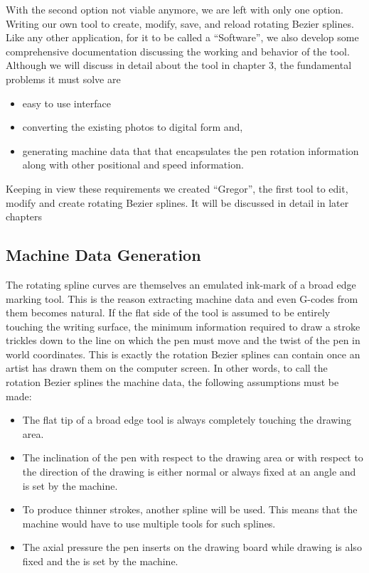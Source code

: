 With the second option not viable anymore, we are left with only one option. Writing our own tool to create, modify, save, and reload rotating Bezier splines. Like any other application, for it to be called a “Software”, we also develop some comprehensive documentation discussing the working and behavior of the tool. Although we will discuss in detail about the tool in chapter 3, the fundamental problems it must solve are

\begin{itemize}
\item easy to use interface
\item converting the existing photos to digital form and,
\item generating machine data that that encapsulates the pen rotation information along with other positional and speed information.
\end{itemize}

Keeping in view these requirements we created “Gregor”, the first tool to edit, modify and create rotating Bezier splines. It will be discussed in detail in later chapters

\subsection{Machine Data Generation}
The rotating spline curves are themselves an emulated ink-mark of a broad edge marking tool. This is the reason extracting machine data and even G-codes from them becomes natural. If the flat side of the tool is assumed to be entirely touching the writing surface, the minimum information required to draw a stroke trickles down to the line on which the pen must move and the twist of the pen in world coordinates. This is exactly the rotation Bezier splines can contain once an artist has drawn them on the computer screen. In other words, to call the rotation Bezier splines the machine data, the following assumptions must be made:
\begin{itemize}
	\item The flat tip of a broad edge tool is always completely touching the drawing area.
	\item The inclination of the pen with respect to the drawing area or with respect to the direction of the drawing is either normal or always fixed at an angle and is set by the machine.
	\item To produce thinner strokes, another spline will be used. This means that the machine would have to use multiple tools for such splines.
	\item The axial pressure the pen inserts on the drawing board while drawing is also fixed and the is set by the machine.
\end{itemize}

